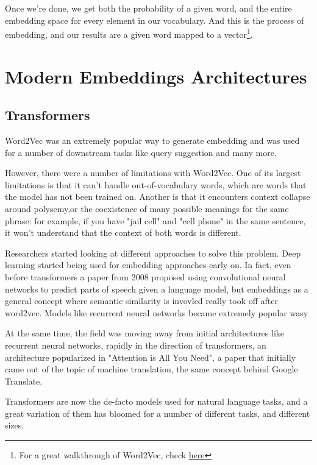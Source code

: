 \documentclass[11pt]{diazessay} %
\begin{document}
Once we're done, we get both the probability of a given word, and the entire embedding space for every element in our vocabulary. And this is the process of embedding, and our results are a given word mapped to a vector\footnote{For a great walkthrough of Word2Vec, check  \href{https://jalammar.github.io/illustrated-word2vec/}{here}}. 

\section{Modern Embeddings Architectures}

\subsection{Transformers}

Word2Vec was an extremely popular way to generate embedding and was used for a number of downstream tasks like query suggestion
\citep{gabin2023keyword} and many more. 

However, there were a number of limitations with Word2Vec. One of its largest limitations is that it can't handle out-of-vocabulary words, which are words that the model has not been trained on.  Another is that it encounters context collapse around polysemy,or the coexistence of many possible meanings for the same phrase: for example, if you have "jail cell" and "cell phone" in the same sentence, it won't understand that the context of both words is different. 

Researchers started looking at different approaches to solve this problem. Deep learning started being used for embedding approaches early on. In fact, even before transformers a paper from 2008 proposed using convolutional neural networks to predict parts of speech given a language model, but embeddings as a general concept where semantic similarity is invovled really took off after word2vec. Models like recurrent neural networks became extremely popular wasy 

At the same time, the field was moving away from initial architectures like recurrent neural networks, rapidly in the direction of transformers, an architecture popularized in "Attention is All You Need", a paper that initially came out of the topic of machine translation, the same concept behind Google Translate\citep{vaswani2017attention}. 

Transformers are now the de-facto models used for natural language tasks, and a great variation of them has bloomed for a number of different tasks, and different sizes. 
\end{document}
